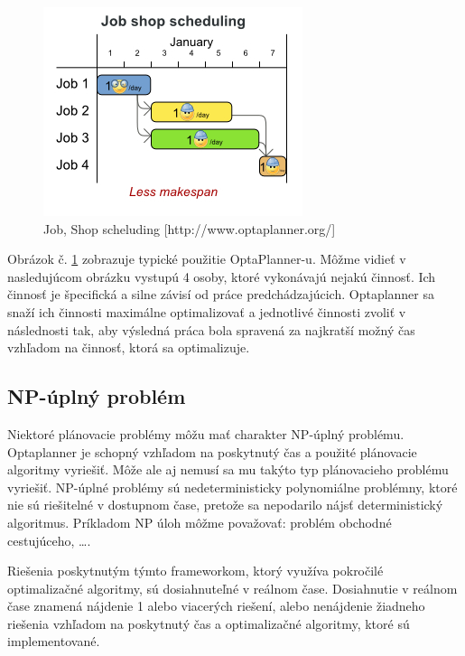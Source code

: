 \begin{figure}[htb]

\begin{center}

\includegraphics[scale=0.5]{fig/useCaseOverview.jpg} 
\caption{Job, Shop scheluding  [http://www.optaplanner.org/] }
\label{obrazokUseCase}

\end{center}

\end{figure}
Obrázok č. \ref{obrazokUseCase} zobrazuje typické použitie OptaPlanner-u. Môžme vidieť v nasledujúcom obrázku vystupú 4 osoby, ktoré vykonávajú nejakú činnosť. Ich činnosť je špecifická a silne závisí od práce predchádzajúcich. Optaplanner sa snaží ich činnosti maximálne optimalizovať a jednotlivé činnosti zvoliť v následnosti tak, aby výsledná práca bola spravená za najkratší možný čas vzhľadom na činnosť, ktorá sa optimalizuje.


\subsection{NP-úplný problém}
Niektoré plánovacie problémy môžu mať charakter NP-úplný problému\cite{npbook}. Optaplanner je schopný vzhľadom na poskytnutý čas a použité plánovacie algoritmy vyriešiť. Môže ale aj nemusí sa mu takýto typ plánovacieho problému vyriešiť. NP-úplné problémy sú nedeterministicky polynomiálne problémny, ktoré nie sú riešitelné v dostupnom čase, pretože sa nepodarilo nájsť deterministický algoritmus. Príkladom NP úloh môžme považovať: problém obchodné cestujúceho, \ldots .

Riešenia poskytnutým týmto frameworkom, ktorý využíva pokročilé optimalizačné algoritmy, sú dosiahnuteľné v reálnom čase. Dosiahnutie v reálnom čase znamená nájdenie 1 alebo viacerých riešení, alebo nenájdenie žiadneho riešenia vzhľadom na poskytnutý čas a optimalizačné algoritmy, ktoré sú implementované.

